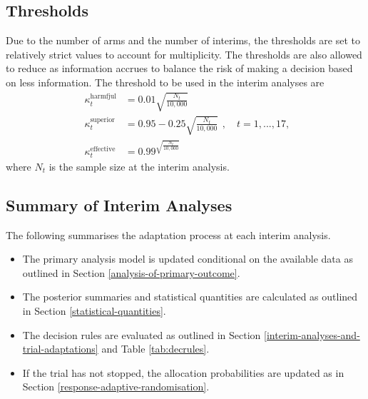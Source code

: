 \documentclass[
  bibliography=totoc]{scrreprt}
\providecommand{\tightlist}{%
  \setlength{\itemsep}{0pt}\setlength{\parskip}{0pt}}
\begin{document}
\hypertarget{thresholds}{%
\subsection{Thresholds}\label{thresholds}}

Due to the number of arms and the number of interims, the thresholds are set to relatively strict values to account for multiplicity.
The thresholds are also allowed to reduce as information accrues to balance the risk of making a decision based on less information.
The threshold to be used in the interim analyses are
\[
\begin{aligned}
\kappa_t^{\text{harmfjul}} &= 0.01{\sqrt{\frac{N_t}{{10,000}}}} \\
\kappa_t^{\text{superior}} &= 0.95 - 0.25\sqrt{\frac{N_t}{10,000}} \\
\kappa_t^{\text{effective}} &= 0.99^{\sqrt{\frac{N_t}{{10,000}}}}
\end{aligned},\quad t = 1,...,17,
\]
where \(N_t\) is the sample size at the interim analysis.

\hypertarget{summary-of-interim-analyses}{%
\subsection{Summary of Interim Analyses}\label{summary-of-interim-analyses}}

The following summarises the adaptation process at each interim analysis.

\begin{itemize}
\tightlist
\item
  The primary analysis model is updated conditional on the available data as outlined in Section \ref{analysis-of-primary-outcome}.
\item
  The posterior summaries and statistical quantities are calculated as outlined in Section \ref{statistical-quantities}.
\item
  The decision rules are evaluated as outlined in Section \ref{interim-analyses-and-trial-adaptations} and Table \ref{tab:decrules}.
\item
  If the trial has not stopped, the allocation probabilities are updated as in Section \ref{response-adaptive-randomisation}.
\end{itemize}
\end{document}
